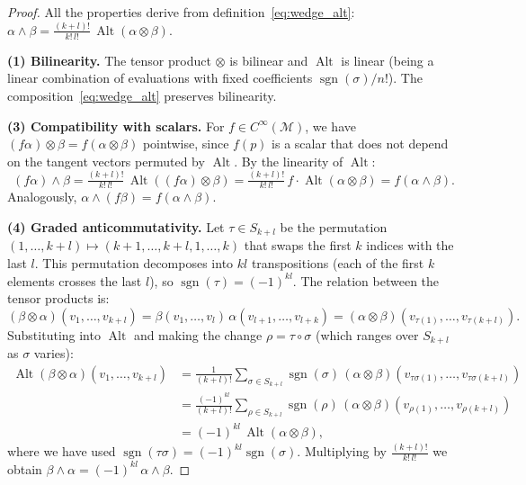 \begin{proof}
All the properties derive from definition~\eqref{eq:wedge_alt}: $\alpha \wedge \beta = \frac{(k+l)!}{k!\,l!}\, \operatorname{Alt}(\alpha \otimes \beta)$.

\textbf{(1) Bilinearity.} The tensor product $\otimes$ is bilinear and $\operatorname{Alt}$ is linear (being a linear combination of evaluations with fixed coefficients $\operatorname{sgn}(\sigma)/n!$). The composition~\eqref{eq:wedge_alt} preserves bilinearity.

\textbf{(3) Compatibility with scalars.} For $f \in C^\infty(\mathcal{M})$, we have $(f\alpha) \otimes \beta = f(\alpha \otimes \beta)$ pointwise, since $f(p)$ is a scalar that does not depend on the tangent vectors permuted by $\operatorname{Alt}$. By the linearity of $\operatorname{Alt}$:
\[
(f\alpha) \wedge \beta = \tfrac{(k+l)!}{k!\,l!}\,\operatorname{Alt}((f\alpha) \otimes \beta) = \tfrac{(k+l)!}{k!\,l!}\,f\cdot\operatorname{Alt}(\alpha \otimes \beta) = f(\alpha \wedge \beta).
\]
Analogously, $\alpha \wedge (f\beta) = f(\alpha \wedge \beta)$.

\textbf{(4) Graded anticommutativity.} Let $\tau \in S_{k+l}$ be the permutation $(1, \ldots, k+l) \mapsto (k{+}1, \ldots, k{+}l, 1, \ldots, k)$ that swaps the first $k$ indices with the last $l$. This permutation decomposes into $kl$ transpositions (each of the first $k$ elements crosses the last $l$), so $\operatorname{sgn}(\tau) = (-1)^{kl}$. The relation between the tensor products is:
\[
(\beta \otimes \alpha)(v_1, \ldots, v_{k+l}) = \beta(v_1, \ldots, v_l)\,\alpha(v_{l+1}, \ldots, v_{l+k}) = (\alpha \otimes \beta)(v_{\tau(1)}, \ldots, v_{\tau(k+l)}).
\]
Substituting into $\operatorname{Alt}$ and making the change $\rho = \tau \circ \sigma$ (which ranges over $S_{k+l}$ as $\sigma$ varies):
\begin{align*}
\operatorname{Alt}(\beta \otimes \alpha)(v_1, \ldots, v_{k+l})
  &= \frac{1}{(k{+}l)!}\sum_{\sigma \in S_{k+l}} \operatorname{sgn}(\sigma)\,(\alpha \otimes \beta)(v_{\tau\sigma(1)}, \ldots, v_{\tau\sigma(k+l)}) \\
  &= \frac{(-1)^{kl}}{(k{+}l)!}\sum_{\rho \in S_{k+l}} \operatorname{sgn}(\rho)\,(\alpha \otimes \beta)(v_{\rho(1)}, \ldots, v_{\rho(k+l)}) \\
  &= (-1)^{kl}\,\operatorname{Alt}(\alpha \otimes \beta),
\end{align*}
where we have used $\operatorname{sgn}(\tau\sigma) = (-1)^{kl}\operatorname{sgn}(\sigma)$. Multiplying by $\frac{(k+l)!}{k!\,l!}$ we obtain $\beta \wedge \alpha = (-1)^{kl}\,\alpha \wedge \beta$.


\end{proof}
